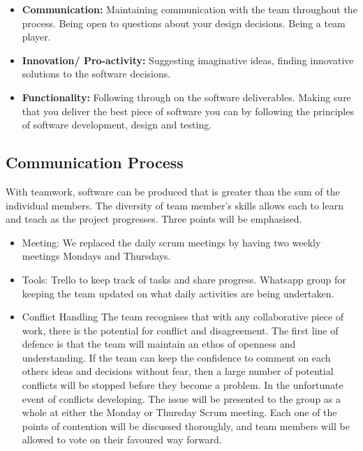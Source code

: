 \documentclass[11pt]{article}
\begin{document}
\begin{itemize}
	\item \textbf{Communication:}
	 Maintaining communication with the team throughout the process. Being open to questions about your design decisions. Being a team player.
	
	\item \textbf{Innovation/ Pro-activity:}
	 Suggesting imaginative ideas, finding innovative solutions to the software decisions.
	
	\item \textbf{Functionality:}
	 Following through on the software deliverables. Making sure that you deliver the best piece of software you can by following the principles of software development, design and testing.
\end{itemize}

\subsection{Communication Process}
With teamwork, software can be produced that is greater than the sum of the individual members. The diversity of team member's skills allows each to learn and teach as the project progresses. Three points will be emphasised.
  \begin{itemize}
  	\item Meeting: We replaced the daily scrum meetings by having two weekly meetings Mondays and Thursdays.
 	\item Tools: Trello to keep track of tasks and share progress. Whatsapp group for keeping the team updated on what daily activities are being undertaken.
  	\item Conflict Handling
 \subitem The team recognises that with any collaborative piece of work, there is the potential for conflict and disagreement. The first line of defence is that the team will maintain an ethos of openness and understanding. If the team can keep the confidence to comment on each others ideas and decisions without fear, then a large number of potential conflicts will be stopped before they become a problem.
 \subitem In the unfortunate event of conflicts developing. The issue will be presented to the group as a whole at either the Monday or Thursday Scrum meeting. Each one of the points of contention will be discussed thoroughly, and team members will be allowed to vote on their favoured way forward.
  \end{itemize}
\end{document}
